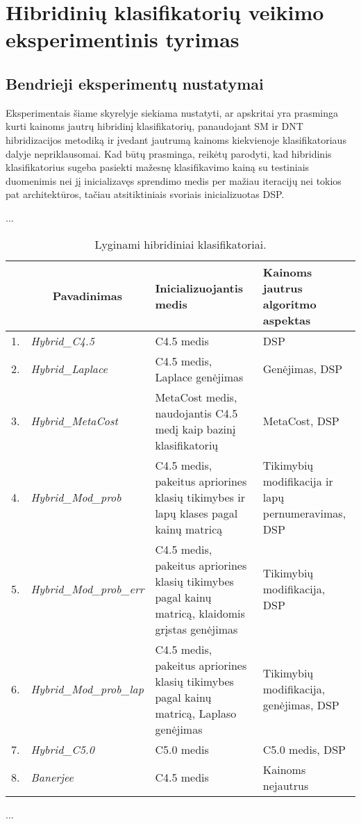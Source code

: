 \section{Hibridinių klasifikatorių veikimo eksperimentinis tyrimas}

\subsection{Bendrieji eksperimentų nustatymai}

Eksperimentais šiame skyrelyje siekiama nustatyti, ar apskritai yra prasminga kurti kainoms jautrų hibridinį klasifikatorių, panaudojant SM ir DNT hibridizacijos metodiką \cite{Banerjee1997} ir įvedant jautrumą kainoms kiekvienoje klasifikatoriaus dalyje nepriklausomai. Kad būtų prasminga, reikėtų parodyti, kad hibridinis klasifikatorius sugeba pasiekti mažesnę klasifikavimo kainą su testiniais duomenimis nei jį inicializavęs sprendimo medis per mažiau iteracijų nei tokios pat architektūros, tačiau atsitiktiniais svoriais inicializuotas DSP.

...

\begin{table}[h!]
  \begin{center}
    \begin{tabular}{|c|p{4.5cm}|p{5cm}|p{3.5cm}|}
      \hline
      & \multicolumn{1}{|c|}{Pavadinimas} & {Inicializuojantis medis} & {Kainoms jautrus algoritmo aspektas} \\
      \hline
      1. & \emph{Hybrid\_C4.5} & C4.5 medis & DSP \\
      2. & \emph{Hybrid\_Laplace} & C4.5 medis, Laplace genėjimas & Genėjimas, DSP \\
      3. & \emph{Hybrid\_MetaCost} & MetaCost medis, naudojantis C4.5 medį kaip bazinį klasifikatorių & MetaCost, DSP \\
      4. & \emph{Hybrid\_Mod\_prob} & C4.5 medis, pakeitus apriorines klasių tikimybes ir lapų klases pagal kainų matricą & Tikimybių modifikacija ir lapų pernumeravimas, DSP \\
      5. & \emph{Hybrid\_Mod\_prob\_err} & C4.5 medis, pakeitus apriorines klasių tikimybes pagal kainų matricą, klaidomis grįstas genėjimas & Tikimybių modifikacija, DSP\\
      6. & \emph{Hybrid\_Mod\_prob\_lap} & C4.5 medis, pakeitus apriorines klasių tikimybes pagal kainų matricą, Laplaso genėjimas & Tikimybių modifikacija, genėjimas, DSP \\
      7. & \emph{Hybrid\_C5.0} & C5.0 medis & C5.0 medis, DSP \\
      8. & \emph{Banerjee} & C4.5 medis & Kainoms nejautrus \\
      \hline
    \end{tabular}
  \end{center}
  \caption{Lyginami hibridiniai klasifikatoriai.}\label{tab:implemented classifiers}
\end{table}

...
